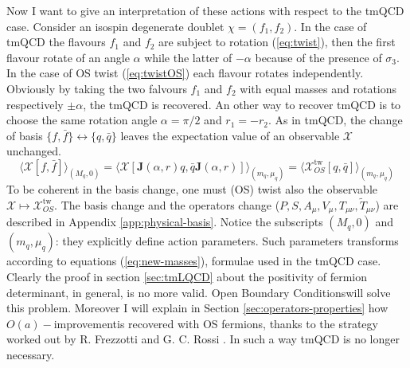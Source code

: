 \documentclass[english, LaM, oneside, noexaminfo]{sapthesis}
\newcommand{\la}{\langle}
\newcommand{\ra}{\rangle}
\newcommand{\oait}{$O(a)-$improvement}
\newcommand{\obc}{Open Boundary Conditions}
\begin{document}
Now I want to give an interpretation of these actions with respect to the tmQCD case.
Consider an isospin degenerate doublet $\chi = (f_1, f_2)$.
In the case of tmQCD the flavours $f_1$ and $f_2$ are subject to rotation (\ref{eq:twist}), then the first flavour rotate of an angle $\alpha$ while the latter of $-\alpha$ because of the presence of $\sigma_3$.
In the case of OS twist (\ref{eq:twistOS}) each flavour rotates independently.
Obviously by taking the two falvours $f_1$ and $f_2$ with equal masses and rotations respectively $\pm \alpha$, the tmQCD is recovered.
An other way to recover tmQCD is to choose the same rotation angle $\alpha = \pi/2$ and $r_1 = - r_2$.
\newline
As in tmQCD, the change of basis $\{f,\bar f\} \leftrightarrow \{q,\bar q\}$ leaves the expectation value of an observable $\mathcal{X}$ unchanged.
\begin{equation*}
    \la \mathcal{X}[f,\bar f]\ra_{(M_q,0)} = \la \mathcal{X}[\mathbf{J}(\alpha, r) q,\bar q\mathbf{J}(\alpha, r)]\ra_{(m_q,\mu_q)} = \la \mathcal{X}^\text{tw}_{OS}[q,\bar q]\ra_{(m_q,\mu_q)}
\end{equation*}
To be coherent in the basis change, one must (OS) twist also the observable $\mathcal{X} \mapsto \mathcal{X}^\text{tw}_{OS}$.
The basis change and the operators change ($P,S,A_\mu,V_\mu,T_{\mu\nu},\tilde{T}_{\mu\nu}$) are described in Appendix \ref{app:physical-basis}.
Notice the subscripts $(M_q,0)$ and $(m_q,\mu_q)$: they explicitly define action parameters.
Such parameters transforms according to equations (\ref{eq:new-masses}), formulae used in the tmQCD case.
\newline
Clearly the proof in section \ref{sec:tmLQCD} about the positivity of fermion determinant, in general, is no more valid.
\obc\space will solve this problem.
Moreover I will explain in Section \ref{sec:operators-properties} how \oait\space is recovered with OS fermions, thanks to the strategy worked out by R. Frezzotti and G. C. Rossi \cite{FR2}.
In such a way tmQCD is no longer necessary.
\end{document}
